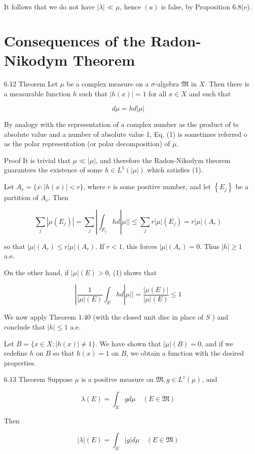 \documentclass[10pt]{article}
\begin{document}
It follows that we do not have $|\lambda| \ll \mu$, hence $(a)$ is false, by Proposition 6.8(e).

\section{Consequences of the Radon-Nikodym Theorem}
6.12 Theorem Let $\mu$ be a complex measure on a $\sigma$-algebra $\mathfrak{M}$ in $X$. Then there is a measurable function $h$ such that $|h(x)|=1$ for all $x \in X$ and such that

$$
d \mu=h d|\mu|
$$

By analogy with the representation of a complex number as the product of ts absolute value and a number of absolute value 1, Eq. (1) is sometimes referred $\mathrm{o}$ as the polar representation (or polar decomposition) of $\mu$.

Proof It is trivial that $\mu \ll|\mu|$, and therefore the Radon-Nikodym theorem guarantees the existence of some $h \in L^{1}(|\mu|)$ which satisfies (1).

Let $A_{r}=\{x:|h(x)|<r\}$, where $r$ is some positive number, and let $\left\{E_{j}\right\}$ be a partition of $A_{r}$. Then

$$
\sum_{j}\left|\mu\left(E_{j}\right)\right|=\sum_{j}\left|\int_{E_{j}} h d\right| \mu|| \leq \sum_{j} r|\mu|\left(E_{j}\right)=r|\mu|\left(A_{r}\right)
$$

so that $|\mu|\left(A_{r}\right) \leq r|\mu|\left(A_{r}\right)$. If $r<1$, this forces $|\mu|\left(A_{r}\right)=0$. Thus $|h| \geq 1$ a.e.

On the other hand, if $|\mu|(E)>0$, (1) shows that

$$
\left|\frac{1}{|\mu|(E)} \int_{E} h d\right| \mu||=\frac{|\mu(E)|}{|\mu|(E)} \leq 1
$$

We now apply Theorem 1.40 (with the closed unit disc in place of $S$ ) and conclude that $|h| \leq 1$ a.e.

Let $B=\{x \in X:|h(x)| \neq 1\}$. We have shown that $|\mu|(B)=0$, and if we redefine $h$ on $B$ so that $h(x)=1$ on $B$, we obtain a function with the desired properties.

6.13 Theorem Suppose $\mu$ is a positive measure on $\mathfrak{M}, g \in L^{1}(\mu)$, and

$$
\lambda(E)=\int_{E} g d \mu \quad(E \in \mathfrak{M})
$$

Then

$$
|\lambda|(E)=\int_{E}|g| d \mu \quad(E \in \mathfrak{M})
$$
\end{document}
